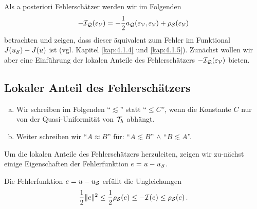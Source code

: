 Als a posteriori Fehlerschätzer werden wir im Folgenden 
\[
	-\mathcal I_{\mathcal Q} (\varepsilon_{\mathcal V})= -\frac 1 2 a_{\mathcal Q}(\varepsilon_{\mathcal V},\varepsilon_{\mathcal V}) + \rho_{\mathcal S}(\varepsilon_{\mathcal V})
\]
betrachten und zeigen, dass dieser äquivalent zum Fehler im Funktional $J(u_{\mathcal S}) - J(u)$ ist (vgl. Kapitel \ref{kap:4.1.4} und \ref{kap:4.1.5}). Zunächst wollen wir aber eine Einführung der lokalen Anteile des Fehlerschätzers $-\mathcal I_{\mathcal Q} (\varepsilon_{\mathcal V})$ bieten.






\subsection{Lokaler Anteil des Fehlerschätzers}
\label{kap:4.1.2}


\begin{notation}
\begin{enumerate}[(a)]
\item Wir schreiben im Folgenden "`$\lesssim$"' statt "`$\le C$"', wenn die Konstante $C$ nur von der Quasi-Uniformität von $\mathcal T_h$ abhängt.
\item Weiter schreiben wir "`$A \approx B$"' für: "`$A\lesssim B$"' $\wedge$ "`$B \lesssim A$"'.
\end{enumerate}
\end{notation}


Um die lokalen Anteile des Fehlerschätzers herzuleiten, zeigen wir zu-nächst einige Eigenschaften der Fehlerfunktion $e = u-u_{\mathcal S}$.



\begin{lemma}\label{lem:4.12}
Die Fehlerfunktion $e = u-u_{\mathcal S}$ erfüllt die Ungleichungen
\begin{align}\label{eq:4.14}
	\frac 12 \lVert e\rVert^2 \le \frac 12 \rho_{\mathcal S}(e) \le -\mathcal I (e) \le \rho_{\mathcal S}(e) \, .
\end{align}
\end{lemma}

